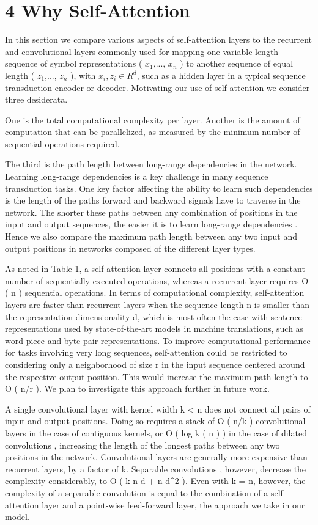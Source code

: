 \documentclass[conference]{IEEEtran}
\begin{document}
\section{4 Why Self-Attention}

In this section we compare various aspects of self-attention layers to the recurrent and convolutional layers commonly used for mapping one variable-length sequence of symbol representations ( $x_1$,..., $x_n$ ) to another sequence of equal length ( $z_1$,..., $z_n$ ), with $x_i, z_i \in R^d$, such as a hidden layer in a typical sequence transduction encoder or decoder. Motivating our use of self-attention we consider three desiderata.

One is the total computational complexity per layer. Another is the amount of computation that can be parallelized, as measured by the minimum number of sequential operations required.

The third is the path length between long-range dependencies in the network. Learning long-range dependencies is a key challenge in many sequence transduction tasks. One key factor affecting the ability to learn such dependencies is the length of the paths forward and backward signals have to traverse in the network. The shorter these paths between any combination of positions in the input and output sequences, the easier it is to learn long-range dependencies \cite{ref12}. Hence we also compare the maximum path length between any two input and output positions in networks composed of the different layer types.

As noted in Table 1, a self-attention layer connects all positions with a constant number of sequentially executed operations, whereas a recurrent layer requires O ( n ) sequential operations. In terms of computational complexity, self-attention layers are faster than recurrent layers when the sequence length n is smaller than the representation dimensionality d, which is most often the case with sentence representations used by state-of-the-art models in machine translations, such as word-piece \cite{ref38} and byte-pair \cite{ref31} representations. To improve computational performance for tasks involving very long sequences, self-attention could be restricted to considering only a neighborhood of size r in the input sequence centered around the respective output position. This would increase the maximum path length to O ( n/r ). We plan to investigate this approach further in future work.

A single convolutional layer with kernel width k < n does not connect all pairs of input and output positions. Doing so requires a stack of O ( n/k ) convolutional layers in the case of contiguous kernels, or O ( log k ( n ) ) in the case of dilated convolutions \cite{ref18}, increasing the length of the longest paths between any two positions in the network. Convolutional layers are generally more expensive than recurrent layers, by a factor of k. Separable convolutions \cite{ref6}, however, decrease the complexity considerably, to O ( k \cdot n \cdot d + n \cdot d^2 ). Even with k = n, however, the complexity of a separable convolution is equal to the combination of a self-attention layer and a point-wise feed-forward layer, the approach we take in our model.
\end{document}
